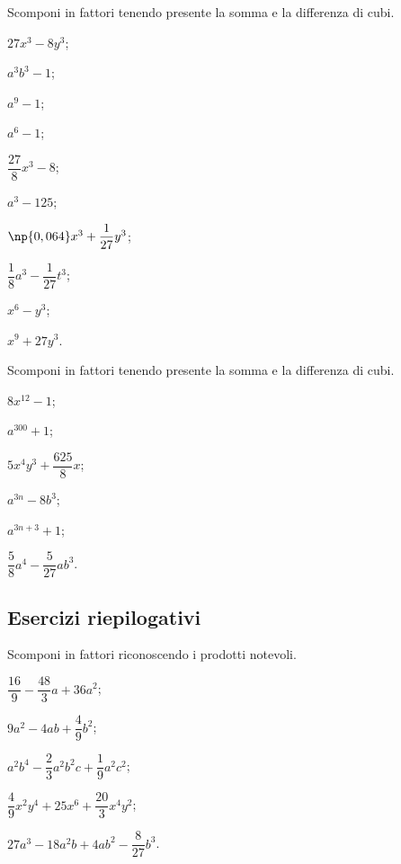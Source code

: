 \begin{esercizio}
\label{ese:13.86}
 Scomponi in fattori tenendo presente la somma e la differenza di cubi.
 \begin{multicols}{3}
 \begin{enumeratea}
  \item $27x^{3}-8y^{3}$;
 \item $a^{3}b^{3}-1$;
 \item $a^{9}-1$;
 \item $a^{6}-1$;
 \item $\dfrac{27}{8}x^{3}-8$;
 \item $a^{3}-125$;
 \item $\np{0,064}x^{3}+\dfrac{1}{27}y^{3}$;
 \item $\dfrac{1}{8}a^{3}-\dfrac{1}{27}t^{3}$;
 \item $x^{6}-y^{3}$;
 \item $x^{9}+27y^{3}$.
 \end{enumeratea}
 \end{multicols}
\end{esercizio}

\begin{esercizio}
\label{ese:13.87}
 Scomponi in fattori tenendo presente la somma e la differenza di cubi.
 \begin{multicols}{3}
 \begin{enumeratea}
 \item $8x^{12}-1$;
 \item $a^{300}+1$;
\item $5x^{4}y^{3}+\dfrac{625}{8}x$;
 \item $a^{3n}-8b^{3}$;
 \item $a^{3n+3}+1$;
 \item $\dfrac{5}{8}a^{4}-\dfrac{5}{27}ab^{3}$.
 \end{enumeratea}
 \end{multicols}
\end{esercizio}

\subsection{Esercizi riepilogativi}

\begin{esercizio}[\Ast]
\label{ese:13.88}
Scomponi in fattori riconoscendo i prodotti notevoli.
\begin{enumeratea}
 \item $\dfrac{16}{9}-\dfrac{48}{3}a+36a^{2}$;
 \item $9a^{2}-4ab+\dfrac{4}{9}b^{2}$;
 \item $a^{2}b^{4}-\dfrac{2}{3}a^{2}b^{2}c+\dfrac{1}{9}a^{2}c^{2}$;
 \item $\dfrac{4}{9}x^{2}y^{4}+25x^{6}+\dfrac{20}{3}x^{4}y^{2}$;
 \item $27a^{3}-18a^{2}b+4ab^{2}-\dfrac{8}{27}b^{3}$.
\end{enumeratea}
\end{esercizio}

